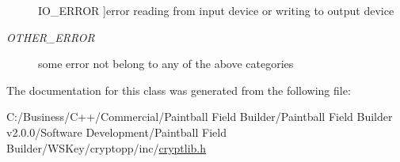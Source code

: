 \begin{Desc}
\begin{description}
{\hypertarget{class_exception_a8e53909d979479380e0274807c074c0aad51c7d0e0156bc1794b3b7f99599aba8}{
IO\_\-ERROR}
\label{class_exception_a8e53909d979479380e0274807c074c0aad51c7d0e0156bc1794b3b7f99599aba8}
}]error reading from input device or writing to output device \item[{\em 
\hypertarget{class_exception_a8e53909d979479380e0274807c074c0aa27d9ee7704100a88e4ae4adcc4072015}{
OTHER\_\-ERROR}
\label{class_exception_a8e53909d979479380e0274807c074c0aa27d9ee7704100a88e4ae4adcc4072015}
}]some error not belong to any of the above categories \end{description}
\end{Desc}



The documentation for this class was generated from the following file:\begin{DoxyCompactItemize}
\item 
C:/Business/C++/Commercial/Paintball Field Builder/Paintball Field Builder v2.0.0/Software Development/Paintball Field Builder/WSKey/cryptopp/inc/\hyperlink{cryptlib_8h}{cryptlib.h}\end{DoxyCompactItemize}
